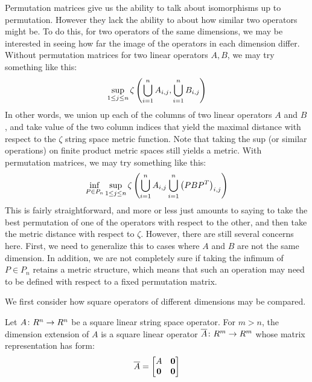 \documentclass[12pt]{article}
\begin{document}
Permutation matrices give us the ability to talk about
isomorphisms up to permutation.
However they lack the ability to about how similar two operators might be.
To do this, for two operators of the same dimensions,
we may be interested in seeing how far the image of the operators
in each dimension differ.
Without permutation matrices
for two linear operators \(A, B\), we may try something like this:
\begin{align*}
  \sup_{1 \leq j \leq n}
    \zeta\left(\bigcup_{i = 1}^{n} A_{i, j},
                 \bigcup_{i = 1}^n B_{i, j}\right)
\end{align*}
In other words, we union up each of the columns of two linear
operators \(A\) and \(B\),
and take value of the two column indices that yield the maximal distance
with respect to the \(\zeta\) string space metric function.
Note that taking the sup (or similar operations) on finite product
metric spaces still yields a metric.
With permutation matrices, we may try something like this:
\begin{align*}
  \inf_{P \in P_n} \sup_{1 \leq j \leq n}
    \zeta\left(\bigcup_{i = 1}^{n} A_{i, j}
                 \bigcup_{i = 1}^{n} \left(P B {P}^{T}\right)_{i, j}\right)
\end{align*}
This is fairly straightforward, and more or less just amounts to saying
to take the best permutation of one of the operators with respect
to the other, and then take the metric distance with respect to
\(\zeta\).
However, there are still several concerns here.
First, we need to generalize this to cases where
\(A\) and \(B\) are not the same dimension.
In addition, we are not completely sure if taking the infimum of
\(P \in P_n\) retains a metric structure,
which means that such an operation may need to be defined with respect
to a fixed permutation matrix.

We first consider how square operators of different dimensions may be compared.

\begin{definition}
  Let \(A \colon R^n \to R^n\) be a square linear string space operator.
  For \(m > n\),
  the dimension extension of \(A\)
  is a square linear operator \(\overline{A} \colon R^m \to R^m\)
  whose matrix representation has form:
  \begin{align*}
    \overline{A} = \begin{bmatrix} A & \mathbf{0} \\ \mathbf{0} & \mathbf{0} \end{bmatrix}
  \end{align*}
\end{definition}
\end{document}
